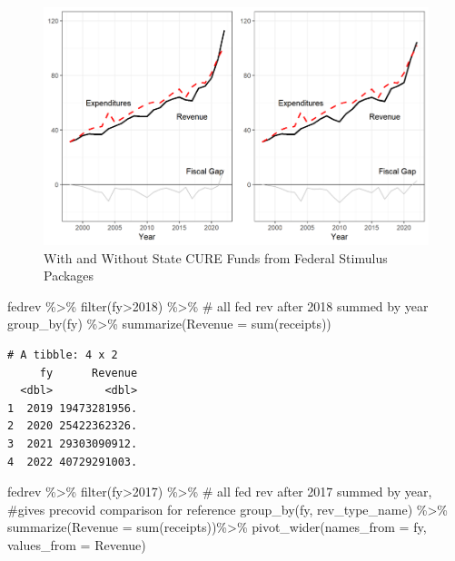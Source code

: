 \documentclass[
  letterpaper,
  DIV=11,
  numbers=noendperiod]{scrreport}
\newenvironment{Shaded}{\begin{snugshade}}{\end{snugshade}}
\newcommand{\AttributeTok}[1]{\textcolor[rgb]{0.40,0.45,0.13}{#1}}
\newcommand{\CommentTok}[1]{\textcolor[rgb]{0.37,0.37,0.37}{#1}}
\newcommand{\DecValTok}[1]{\textcolor[rgb]{0.68,0.00,0.00}{#1}}
\newcommand{\FunctionTok}[1]{\textcolor[rgb]{0.28,0.35,0.67}{#1}}
\newcommand{\NormalTok}[1]{\textcolor[rgb]{0.00,0.23,0.31}{#1}}
\newcommand{\SpecialCharTok}[1]{\textcolor[rgb]{0.37,0.37,0.37}{#1}}
\begin{document}
\begin{figure}

{\centering \includegraphics{./images/image-1706772717.png}

}

\caption{\label{fig-with-without-cure}With and Without State CURE Funds
from Federal Stimulus Packages}

\end{figure}

\begin{Shaded}
\begin{Highlighting}[]
\NormalTok{fedrev }\SpecialCharTok{\%\textgreater{}\%} 
  \FunctionTok{filter}\NormalTok{(fy}\SpecialCharTok{\textgreater{}}\DecValTok{2018}\NormalTok{) }\SpecialCharTok{\%\textgreater{}\%} \CommentTok{\# all fed rev after 2018 summed by year}
  \FunctionTok{group\_by}\NormalTok{(fy) }\SpecialCharTok{\%\textgreater{}\%} 
  \FunctionTok{summarize}\NormalTok{(}\AttributeTok{Revenue =} \FunctionTok{sum}\NormalTok{(receipts))}
\end{Highlighting}
\end{Shaded}

\begin{verbatim}
# A tibble: 4 x 2
     fy      Revenue
  <dbl>        <dbl>
1  2019 19473281956.
2  2020 25422362326.
3  2021 29303090912.
4  2022 40729291003.
\end{verbatim}

\begin{Shaded}
\begin{Highlighting}[]
\NormalTok{fedrev }\SpecialCharTok{\%\textgreater{}\%} 
  \FunctionTok{filter}\NormalTok{(fy}\SpecialCharTok{\textgreater{}}\DecValTok{2017}\NormalTok{) }\SpecialCharTok{\%\textgreater{}\%} \CommentTok{\# all fed rev after 2017 summed by year, \#gives precovid comparison for reference}
  \FunctionTok{group\_by}\NormalTok{(fy, rev\_type\_name) }\SpecialCharTok{\%\textgreater{}\%} 
  \FunctionTok{summarize}\NormalTok{(}\AttributeTok{Revenue =} \FunctionTok{sum}\NormalTok{(receipts))}\SpecialCharTok{\%\textgreater{}\%}
  \FunctionTok{pivot\_wider}\NormalTok{(}\AttributeTok{names\_from =}\NormalTok{ fy, }\AttributeTok{values\_from =}\NormalTok{ Revenue)}
\end{Highlighting}
\end{Shaded}
\end{document}
